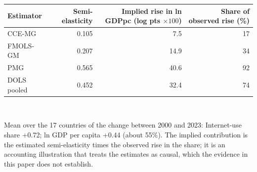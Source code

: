 \begin{tabular}{lrrr}\toprule
Estimator & Semi-elasticity & Implied rise in ln GDPpc (log pts $\times 100$) & Share of observed rise (\%) \\
\midrule
CCE-MG & 0.105 & 7.5 & 17 \\
FMOLS-GM & 0.207 & 14.9 & 34 \\
PMG & 0.565 & 40.6 & 92 \\
DOLS pooled & 0.452 & 32.4 & 74 \\
\bottomrule\end{tabular}
\\[3pt]\begin{minipage}{\tablewidth}\footnotesize Mean over the 17 countries of the change between 2000 and 2023: Internet-use share +0.72; ln GDP per capita +0.44 (about 55\%). The implied contribution is the estimated semi-elasticity times the observed rise in the share; it is an accounting illustration that treats the estimates as causal, which the evidence in this paper does not establish.\end{minipage}
